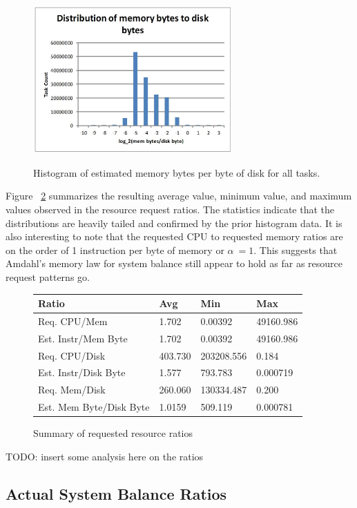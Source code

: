 \documentclass{sig-alternate}
\begin{document}
\begin{figure}
\centering
\includegraphics[width=3in]{../figures/est_req_mem_disk.jpg}
\label{est_req_mem_disk}
\caption{Histogram of estimated memory bytes per byte of disk for all tasks.}
\end{figure}

Figure ~\ref{request_summary} summarizes the resulting average value, minimum value, and maximum values observed in the resource request ratios.
The statistics indicate that the distributions are heavily tailed and confirmed by the prior histogram data.
It is also interesting to note that the requested CPU to requested memory ratios are on the order of 1 instruction per byte of memory or $\alpha ~= 1$.
This suggests that Amdahl's memory law for system balance still appear to hold as far as resource request patterns go.

\begin{figure}
\centering
\begin{tabular}{| p{2.5cm} | p{1.5cm} | p{1.5cm} | p{1.5cm } |} \hline
Ratio & Avg & Min & Max \\ \hline
Req. CPU/Mem & 1.702 & 0.00392 & 49160.986  \\ \hline
Est. Instr/Mem Byte & 1.702 & 0.00392 & 49160.986 \\ \hline
Req. CPU/Disk & 403.730 & 203208.556 & 0.184 \\ \hline
Est. Instr/Disk Byte & 1.577 & 793.783 & 0.000719 \\ \hline
Req. Mem/Disk & 260.060 & 130334.487 & 0.200 \\ \hline
Est. Mem Byte/Disk Byte & 1.0159& 509.119 & 0.000781 \\ \hline
\end{tabular}
\label{request_summary}
\caption{Summary of requested resource ratios}
\end{figure}

TODO: insert some analysis here on the ratios

\subsection{Actual System Balance Ratios}
\end{document}
